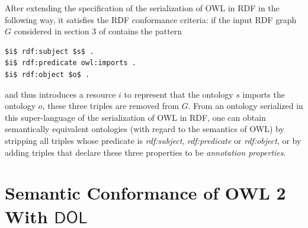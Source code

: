 \documentclass[10pt,fleqn,final]{scrreprt}
\newcommand*{\DOL}{\ensuremath{\mathsf{DOL}}\xspace}
\newcommand{\noterefname}{note}
\newcommand{\nref}[1]{\noterefname~\ref{#1}}
\renewcommand{\nref}[1]{\ref{nref-#1}} %
\newenvironment{definitions}[0]{\medskip }{}
\providecommand{\DIFadd}[1]{{\protect\color{blue}\uwave{#1}}} %
\providecommand{\DIFaddbegin}{} %
\providecommand{\DIFaddend}{} %
\providecommand{\DIFdelbegin}{} %
\providecommand{\DIFdelend}{} %
\begin{document}
\begin{definitions}
After extending the specification of the serialization of OWL in RDF in the following way, it satisfies the RDF conformance criteria: if the input RDF graph $G$ considered in section 3 of \DIFdelbegin %
\DIFdelend \DIFaddbegin \DIFadd{\nref{OWL2RDF} }\DIFaddend contains the pattern

\begin{lstlisting}[basicstyle=\small\ttfamily,language=N3,mathescape]
$i$ rdf:subject $s$ .
$i$ rdf:predicate owl:imports .
$i$ rdf:object $o$ .
\end{lstlisting}

and thus introduces a resource $i$ to represent that the ontology $s$ imports the ontology $o$, these three triples are removed from $G$.
From an ontology serialized in this super-language of the serialization of OWL in RDF, one can obtain semantically equivalent ontologies (with regard to the semantics of OWL) by stripping all triples whose predicate is \textit{rdf:subject}, \textit{rdf:predicate} or \textit{rdf:object}, or by adding triples that declare these three properties to be \emph{annotation properties}.

\DIFdelbegin %
\DIFdelend \DIFaddbegin \section{Semantic Conformance of OWL 2 With \DOL}\DIFaddend \label{a:owl-logic}


\end{definitions}
\end{document}

